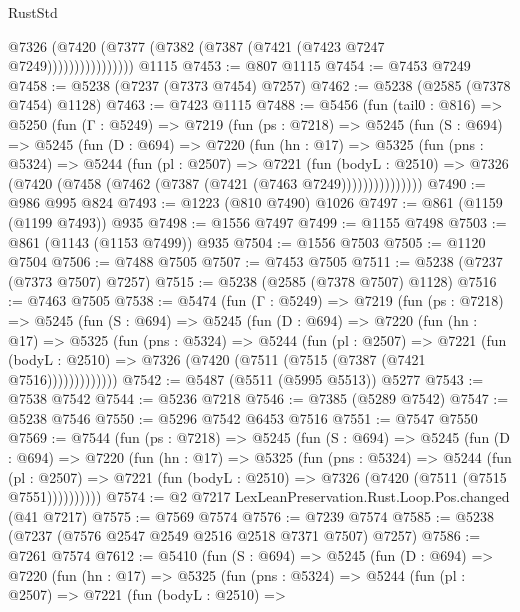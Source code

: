 \begin{lexlean}{RustStd}
\begin{coremodule}
                      @7326 (@7420 (@7377 (@7382 (@7387 (@7421 (@7423 @7247 @7249))))))))))))))))
    @1115
@7453 := @807 @1115
@7454 := @7453 @7249
@7458 := @5238 (@7237 (@7373 @7454) @7257)
@7462 := @5238 (@2585 (@7378 @7454) @1128)
@7463 := @7423 @1115
@7488 := @5456
    (fun (tail0 : @816) =>
    @5250
      (fun (Γ : @5249) =>
      @7219
        (fun (ps : @7218) =>
        @5245
          (fun (S : @694) =>
          @5245
            (fun (D : @694) =>
            @7220
              (fun (hn : @17) =>
              @5325
                (fun (pns : @5324) =>
                @5244
                  (fun (pl : @2507) =>
                  @7221
                    (fun (bodyL : @2510) =>
                    @7326 (@7420 (@7458 (@7462 (@7387 (@7421 (@7463 @7249)))))))))))))))
@7490 := @986 @995 @824
@7493 := @1223 (@810 @7490) @1026
@7497 := @861 (@1159 (@1199 @7493)) @935
@7498 := @1556 @7497
@7499 := @1155 @7498
@7503 := @861 (@1143 (@1153 @7499)) @935
@7504 := @1556 @7503
@7505 := @1120 @7504
@7506 := @7488 @7505
@7507 := @7453 @7505
@7511 := @5238 (@7237 (@7373 @7507) @7257)
@7515 := @5238 (@2585 (@7378 @7507) @1128)
@7516 := @7463 @7505
@7538 := @5474
    (fun (Γ : @5249) =>
    @7219
      (fun (ps : @7218) =>
      @5245
        (fun (S : @694) =>
        @5245
          (fun (D : @694) =>
          @7220
            (fun (hn : @17) =>
            @5325
              (fun (pns : @5324) =>
              @5244
                (fun (pl : @2507) =>
                @7221
                  (fun (bodyL : @2510) =>
                  @7326 (@7420 (@7511 (@7515 (@7387 (@7421 @7516)))))))))))))
@7542 := @5487 (@5511 (@5995 @5513)) @5277
@7543 := @7538 @7542
@7544 := @5236 @7218
@7546 := @7385 (@5289 @7542)
@7547 := @5238 @7546
@7550 := @5296 @7542 @6453 @7516
@7551 := @7547 @7550
@7569 := @7544
    (fun (ps : @7218) =>
    @5245
      (fun (S : @694) =>
      @5245
        (fun (D : @694) =>
        @7220
          (fun (hn : @17) =>
          @5325
            (fun (pns : @5324) =>
            @5244
              (fun (pl : @2507) =>
              @7221 (fun (bodyL : @2510) => @7326 (@7420 (@7511 (@7515 @7551))))))))))
@7574 := @2 @7217 LexLeanPreservation.Rust.Loop.Pos.changed (@41 @7217)
@7575 := @7569 @7574
@7576 := @7239 @7574
@7585 := @5238 (@7237 (@7576 @2547 @2549 @2516 @2518 @7371 @7507) @7257)
@7586 := @7261 @7574
@7612 := @5410
    (fun (S : @694) =>
    @5245
      (fun (D : @694) =>
      @7220
        (fun (hn : @17) =>
        @5325
          (fun (pns : @5324) =>
          @5244
            (fun (pl : @2507) =>
            @7221
              (fun (bodyL : @2510) =>

\end{coremodule}
\end{lexlean}
